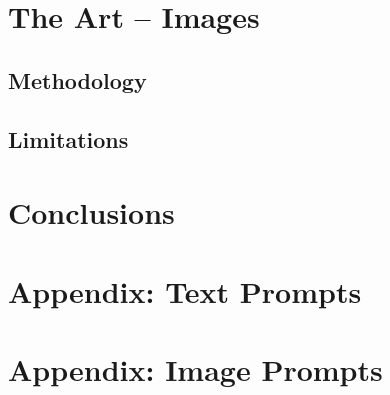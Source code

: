 \documentclass[a4paper,11pt]{article}
\begin{document}
\section{The Art -- Images}

\subsection*{Methodology}

\subsection*{Limitations}



\section{Conclusions}





\newpage
\appendix

\section{Appendix: Text Prompts}



\newpage
\section{Appendix: Image Prompts}


\newpage 
 
 
\end{document}
